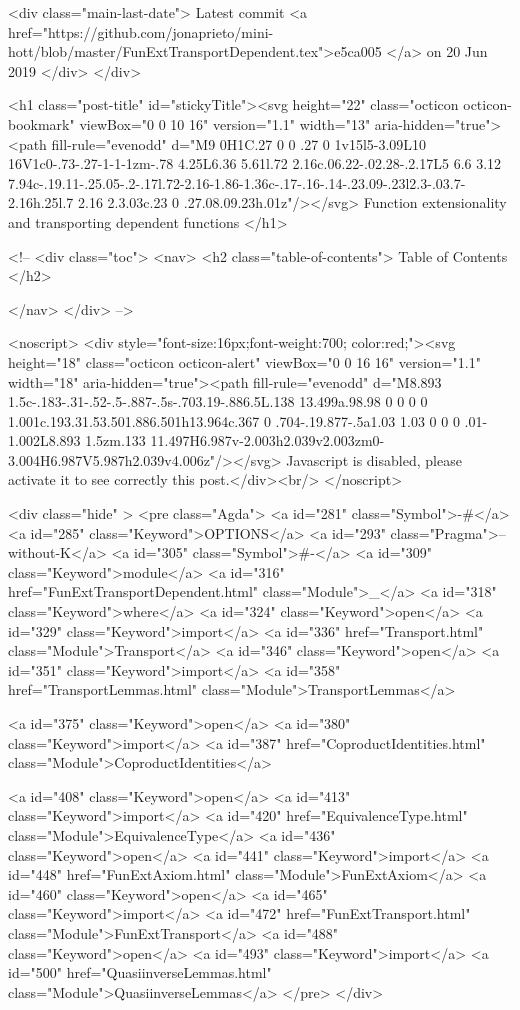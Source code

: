     <div class="main-last-date">
      Latest commit <a href="https://github.com/jonaprieto/mini-hott/blob/master/FunExtTransportDependent.tex">e5ca005 </a> on  20 Jun 2019
    </div>
  </div>
  
  <h1 class="post-title" id="stickyTitle"><svg height="22" class="octicon octicon-bookmark" viewBox="0 0 10 16" version="1.1" width="13" aria-hidden="true"><path fill-rule="evenodd" d="M9 0H1C.27 0 0 .27 0 1v15l5-3.09L10 16V1c0-.73-.27-1-1-1zm-.78 4.25L6.36 5.61l.72 2.16c.06.22-.02.28-.2.17L5 6.6 3.12 7.94c-.19.11-.25.05-.2-.17l.72-2.16-1.86-1.36c-.17-.16-.14-.23.09-.23l2.3-.03.7-2.16h.25l.7 2.16 2.3.03c.23 0 .27.08.09.23h.01z"/></svg> Function extensionality and transporting dependent functions 
  </h1>

  <!-- 
  <div class="toc">
    <nav>
    <h2 class="table-of-contents"> Table of Contents </h2>
      

    </nav>
  </div>
   -->

  <noscript>
  <div style="font-size:16px;font-weight:700; color:red;"><svg height="18" class="octicon octicon-alert" viewBox="0 0 16 16" version="1.1" width="18" aria-hidden="true"><path fill-rule="evenodd" d="M8.893 1.5c-.183-.31-.52-.5-.887-.5s-.703.19-.886.5L.138 13.499a.98.98 0 0 0 0 1.001c.193.31.53.501.886.501h13.964c.367 0 .704-.19.877-.5a1.03 1.03 0 0 0 .01-1.002L8.893 1.5zm.133 11.497H6.987v-2.003h2.039v2.003zm0-3.004H6.987V5.987h2.039v4.006z"/></svg> Javascript is disabled, please activate it to see correctly this post.</div><br/>
  </noscript>

  <div class="hide" >
<pre class="Agda">
<a id="281" class="Symbol">{-#</a> <a id="285" class="Keyword">OPTIONS</a> <a id="293" class="Pragma">--without-K</a> <a id="305" class="Symbol">#-}</a>
<a id="309" class="Keyword">module</a> <a id="316" href="FunExtTransportDependent.html" class="Module">_</a> <a id="318" class="Keyword">where</a>
<a id="324" class="Keyword">open</a> <a id="329" class="Keyword">import</a> <a id="336" href="Transport.html" class="Module">Transport</a>
<a id="346" class="Keyword">open</a> <a id="351" class="Keyword">import</a> <a id="358" href="TransportLemmas.html" class="Module">TransportLemmas</a>

<a id="375" class="Keyword">open</a> <a id="380" class="Keyword">import</a> <a id="387" href="CoproductIdentities.html" class="Module">CoproductIdentities</a>

<a id="408" class="Keyword">open</a> <a id="413" class="Keyword">import</a> <a id="420" href="EquivalenceType.html" class="Module">EquivalenceType</a>
<a id="436" class="Keyword">open</a> <a id="441" class="Keyword">import</a> <a id="448" href="FunExtAxiom.html" class="Module">FunExtAxiom</a>
<a id="460" class="Keyword">open</a> <a id="465" class="Keyword">import</a> <a id="472" href="FunExtTransport.html" class="Module">FunExtTransport</a>
<a id="488" class="Keyword">open</a> <a id="493" class="Keyword">import</a> <a id="500" href="QuasiinverseLemmas.html" class="Module">QuasiinverseLemmas</a>
</pre>
</div>

